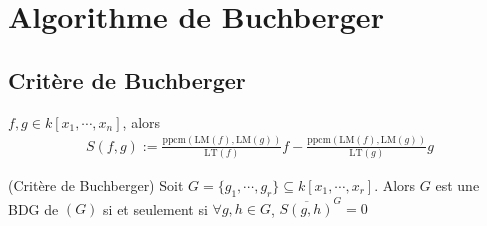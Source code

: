     \section{Algorithme de Buchberger}
        \subsection{Critère de Buchberger}
            \begin{defi}
                $f,g \in k[x_1, \cdots, x_n]$, alors
                \begin{align*}
                    S(f,g) := \frac{\mathrm{ppcm} (\mathrm{LM}(f), \mathrm{LM}(g))}{\mathrm{LT}(f)}f - \frac{\mathrm{ppcm} (\mathrm{LM}(f), \mathrm{LM}(g))}{\mathrm{LT}(g)}g
                \end{align*}
            \end{defi}
            \begin{theo} (Critère de Buchberger)
                Soit $G = \{g_1, \cdots, g_r\} \subseteq k[x_1, \cdots, x_r]$. Alors $G$ est une BDG de $(G)$ si et seulement si $\forall g,h \in G$, $\overline{S(g,h)}^G = 0$
            \end{theo}
